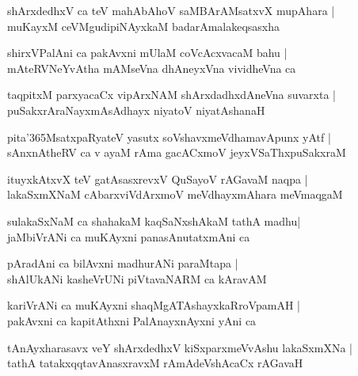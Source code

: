 \begin{shloka}
shArxdedhxV ca teV mahAbAhoV saMBArAMsatxvX mupAhara |\\
muKayxM ceVMgudipiNAyxkaM badarAmalakeqsasxha 
\end{shloka}

\begin{shloka}
shirxVPalAni ca pakAvxni mUlaM coVcAcxvacaM bahu |\\
mAteRVNeYvAtha mAMseVna dhAneyxVna vividheVna ca 
\end{shloka}

\begin{shloka}
taqpitxM parxyacaCx vipArxNAM shArxdadhxdAneVna suvarxta |\\
puSakxrAraNayxmAsAdhayx niyatoV niyatAshanaH
\end{shloka}

\begin{shloka}
pita\char'365MsatxpaRyateV yasutx soVshavxmeVdhamavApunx yAtf |\\
sAnxnAtheRV ca v ayaM rAma gacACxmoV jeyxVSaThxpuSakxraM
\end{shloka}

\begin{shloka}
ituyxkAtxvX teV gatAsasxrevxV QuSayoV rAGavaM naqpa |\\
lakaSxmXNaM cAbarxviVdArxmoV meVdhayxmAhara meVmaqgaM 
\end{shloka}

\begin{shloka}
sulakaSxNaM ca shahakaM kaqSaNxshAkaM tathA madhu|\\
jaMbiVrANi ca muKAyxni panasAnutatxmAni ca 
\end{shloka}

\begin{shloka}
pAradAni ca bilAvxni madhurANi paraMtapa |\\
shAlUkANi kasheVrUNi piVtavaNARM ca kAravAM
\end{shloka}

\begin{shloka}
kariVrANi ca muKAyxni shaqMgATAshayxkaRroVpamAH |\\
pakAvxni ca kapitAthxni PalAnayxnAyxni yAni ca 
\end{shloka}

\begin{shloka}
tAnAyxharasavx veY shArxdedhxV kiSxparxmeVvAshu lakaSxmXNa |\\
tathA tatakxqqtavAnasxravxM rAmAdeVshAcaCx rAGavaH
\end{shloka}

